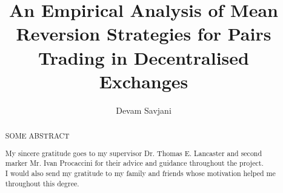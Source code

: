 \documentclass[a4paper, 11pt]{report}
\title{An Empirical Analysis of Mean Reversion Strategies for Pairs Trading in Decentralised Exchanges}
\author{Devam Savjani}
\begin{document}


\begin{abstract}
    SOME ABSTRACT
\end{abstract}

\renewcommand{\abstractname}{Acknowledgements}
\begin{abstract}
My sincere gratitude goes to my supervisor Dr. Thomas E. Lancaster and second marker Mr. Ivan Procaccini for their advice and guidance throughout the project.
\\[3mm]
I would also send my gratitude to my family and friends whose motivation helped me throughout this degree.
\end{abstract}

\tableofcontents












\end{document}
